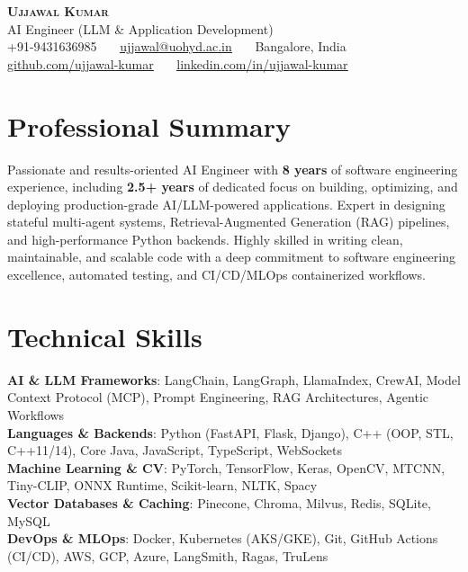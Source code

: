 \documentclass[letterpaper,10pt]{article}
\begin{document}
\begin{center}
    \textbf{\Huge \scshape Ujjawal Kumar} \\ \vspace{3pt}
    \small AI Engineer (LLM \& Application Development) \\ \vspace{3pt}
    \small +91-9431636985 \ \textbullet\ \ \href{mailto:ujjawal@uohyd.ac.in}{\underline{ujjawal@uohyd.ac.in}} \ \textbullet\ \ Bangalore, India \\ \vspace{2pt}
    \small \href{https://github.com/ujjawal-kumar}{\underline{github.com/ujjawal-kumar}} \ \textbullet\ \ \href{https://linkedin.com/in/ujjawal-kumar}{\underline{linkedin.com/in/ujjawal-kumar}}
    \vspace{-10pt}
\end{center}


\section{Professional Summary}
Passionate and results-oriented AI Engineer with \textbf{8 years} of software engineering experience, including \textbf{2.5+ years} of dedicated focus on building, optimizing, and deploying production-grade AI/LLM-powered applications. Expert in designing stateful multi-agent systems, Retrieval-Augmented Generation (RAG) pipelines, and high-performance Python backends. Highly skilled in writing clean, maintainable, and scalable code with a deep commitment to software engineering excellence, automated testing, and CI/CD/MLOps containerized workflows.

\section{Technical Skills}
 \begin{itemize}[leftmargin=0.15in, label={}]
    \small{\item{
     \textbf{AI \& LLM Frameworks}{: LangChain, LangGraph, LlamaIndex, CrewAI, Model Context Protocol (MCP), Prompt Engineering, RAG Architectures, Agentic Workflows} \\ \vspace{1pt}
     \textbf{Languages \& Backends}{: Python (FastAPI, Flask, Django), C++ (OOP, STL, C++11/14), Core Java, JavaScript, TypeScript, WebSockets} \\ \vspace{1pt}
     \textbf{Machine Learning \& CV}{: PyTorch, TensorFlow, Keras, OpenCV, MTCNN, Tiny-CLIP, ONNX Runtime, Scikit-learn, NLTK, Spacy} \\ \vspace{1pt}
     \textbf{Vector Databases \& Caching}{: Pinecone, Chroma, Milvus, Redis, SQLite, MySQL} \\ \vspace{1pt}
     \textbf{DevOps \& MLOps}{: Docker, Kubernetes (AKS/GKE), Git, GitHub Actions (CI/CD), AWS, GCP, Azure, LangSmith, Ragas, TruLens}
    }}
 \end{itemize}
\end{document}
